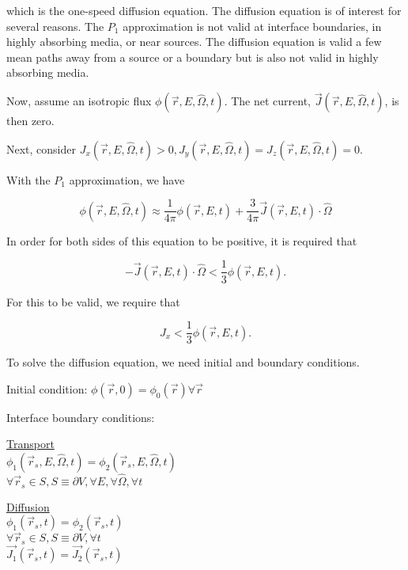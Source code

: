 \documentclass[12pt]{article}
\newcommand{\rvec}{\ensuremath{\vec{r}}}
\newcommand{\omvec}{\ensuremath{\hat{\Omega}}}
\begin{document}
which is the one-speed diffusion equation. The diffusion equation is of interest for several reasons. The
$P_1$ approximation is not valid at interface boundaries, in highly absorbing media, or near sources. The
diffusion equation is valid a few mean paths away from a source or a boundary but is also not valid in
highly absorbing media.


Now, assume an isotropic flux $\phi(\rvec,E,\omvec,t)$. The net current, $\vec{J}(\rvec,E,\omvec,t)$, is 
then zero.


Next, consider $J_x(\rvec,E,\omvec,t) > 0, J_y(\rvec,E,\omvec,t) = J_z(\rvec,E,\omvec,t) = 0$.


With the $P_1$ approximation, we have

\begin{equation*}
\phi(\rvec,E,\omvec,t)\approx\frac{1}{4\pi}\phi(\rvec,E,t)+\frac{3}{4\pi}\vec{J}(\rvec,E,t)\cdot\omvec
\end{equation*}

In order for both sides of this equation to be positive, it is required that

\begin{equation*}
-\vec{J}(\rvec,E,t)\cdot\omvec < \frac{1}{3}\phi(\rvec,E,t).
\end{equation*}

For this to be valid, we require that

\begin{equation*}
J_x < \frac{1}{3}\phi(\rvec,E,t).
\end{equation*}

To solve the diffusion equation, we need initial and boundary conditions.


Initial condition: $\phi(\rvec,0) = \phi_0(\rvec) \forall\rvec$


Interface boundary conditions:

\begin{minipage}[t]{0.5\textwidth}
\underline{Transport} \\
$\phi_1(\rvec_s,E,\omvec,t) = \phi_2(\rvec_s,E,\omvec,t)$ \\
$\forall\rvec_s \in S, S \equiv \partial V, \forall E, \forall \omvec, \forall t$
\end{minipage}
\begin{minipage}[t]{0.5\textwidth}
\underline{Diffusion} \\
$\phi_1(\rvec_s,t) = \phi_2(\rvec_s,t)$ \\
$\forall\rvec_s \in S, S \equiv \partial V, \forall t$ \\
$\vec{J_1}(\rvec_s,t) = \vec{J_2}(\rvec_s,t)$
\end{minipage}
\end{document}
